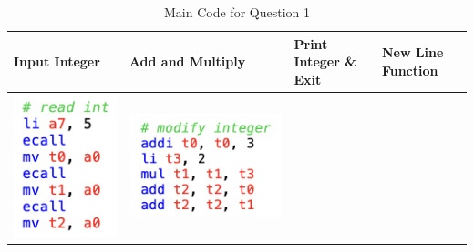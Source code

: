 \documentclass[10pt,a4paper]{article}
\begin{document}
\begin{ans}
\begin{table}[htbp]
    \begin{center}
        \caption{Main Code for Question 1}
        \begin{tabular}{|M{2.5cm}|M{3.5cm}|M{2cm}|M{4cm}|}
            \hline
            Input Integer & Add and Multiply & Print Integer \& Exit & New Line Function\\
            \hline
            \centering
            \includegraphics[scale = 0.5]{Lab1-1-1.png} &
            \includegraphics[scale = 0.5]{Lab1-1-2.png} &

\end{tabular}
\end{center}
\end{table}
\end{ans}
\end{document}
